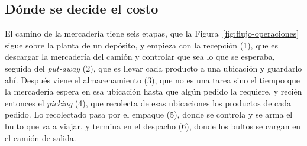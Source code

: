 \subsection{Dónde se decide el costo}

El camino de la mercadería tiene seis etapas, que la Figura~\ref{fig:flujo-operaciones} sigue sobre la planta de un depósito, y empieza con la recepción (1), que es descargar la mercadería del camión y controlar que sea lo que se esperaba, seguida del \emph{put-away} (2), que es llevar cada producto a una ubicación y guardarlo ahí.
Después viene el almacenamiento (3), que no es una tarea sino el tiempo que la mercadería espera en esa ubicación hasta que algún pedido la requiere, y recién entonces el \emph{picking} (4), que recolecta de esas ubicaciones los productos de cada pedido.
Lo recolectado pasa por el empaque (5), donde se controla y se arma el bulto que va a viajar, y termina en el despacho (6), donde los bultos se cargan en el camión de salida.

